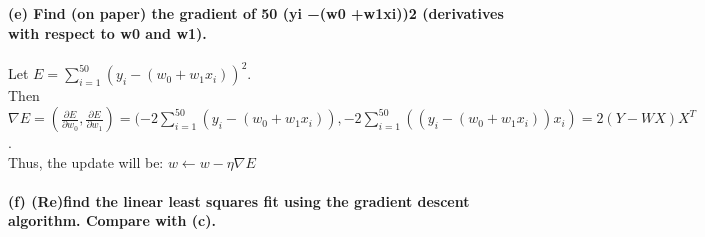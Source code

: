 \documentclass[11pt]{article}
\begin{document}
    \begin{center}
    \end{center}
    { \hspace*{\fill} \\}
    
    \paragraph{(e) Find (on paper) the gradient of 50 (yi −(w0 +w1xi))2
(derivatives with respect to w0 and
w1).}\label{e-find-on-paper-the-gradient-of-50-yi-w0-w1xi2-derivatives-with-respect-to-w0-and-w1.}

{ Let \(E = \sum_{i=1}^{50}(y_i-(w_0+w_1x_i))^2\).\\
Then
\(\nabla E = (\frac{\partial E}{\partial w_0},\frac{\partial E}{\partial w_1}) = (-2\sum_{i=1}^{50}(y_i-(w_0+w_1x_i)),-2\sum_{i=1}^{50}((y_i-(w_0+w_1x_i))x_i) = 2(Y-WX)X^T\).\\
Thus, the update will be: \(w \leftarrow w - \eta \nabla E\) }

    \paragraph{(f) (Re)find the linear least squares fit using the gradient
descent algorithm. Compare with
(c).}\label{f-refind-the-linear-least-squares-fit-using-the-gradient-descent-algorithm.-compare-with-c.}
\end{document}
